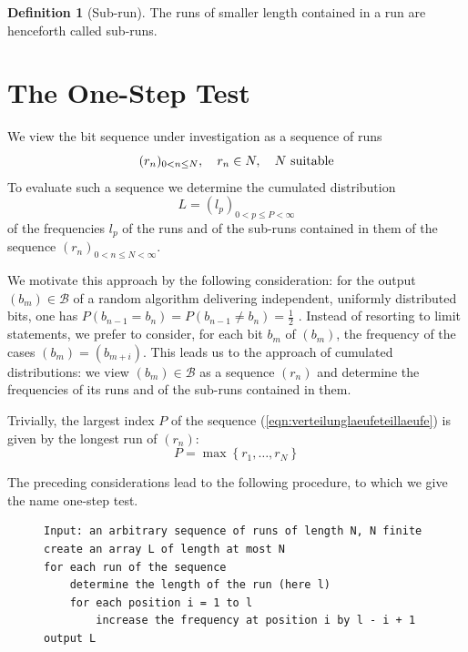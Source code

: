 \documentclass[11pt,a4paper]{scrartcl}
\theoremstyle{plain}
\theoremstyle{definition}
\newtheorem{defi}[satz]{Definition}
\theoremstyle{remark}
\begin{document}
\begin{defi}[Sub-run]\label{defi:teillauf}
The runs of smaller length contained in a run are henceforth called
sub-runs.
\end{defi}

\section{The One-Step Test}\label{sec:einschritttest}

We view the bit sequence under investigation as a sequence of runs
\begin{equation}\label{eqn:laeuflangefolge}
  (r_n)_{0<n\leq N},\quad r_n\in\mathcal \mathbb N,\quad N\text{ suitable}
\end{equation}
To evaluate such a sequence we determine the cumulated distribution
\begin{equation}\label{eqn:verteilunglaeufeteillaeufe}
  L=(l_p)_{0<p\leq P<\infty}
\end{equation}
of the frequencies $l_p$ of the runs and of the sub-runs contained in
them of the sequence $(r_n)_{0<n\leq N<\infty}$.

We motivate this approach by the following consideration: for the
output $(b_m)\in \mathcal B$ of a random algorithm delivering
independent, uniformly distributed bits, one has
$P(b_{n-1}=b_n)=P(b_{n-1}\neq b_n)=\tfrac{1}{2}$ \cite{feller1968}.
Instead of resorting to limit statements, we prefer to consider, for
each bit $b_m$ of $(b_m)$, the frequency of the cases
$(b_{m})=(b_{m+i})$. This leads us to the approach of cumulated
distributions: we view $(b_m)\in\mathcal B$ as a sequence $(r_n)$ and
determine the frequencies of its runs and of the sub-runs contained
in them.

Trivially, the largest index $P$ of the sequence
(\ref{eqn:verteilunglaeufeteillaeufe}) is given by the longest run of
$(r_n)$:
\begin{equation}\label{eqn:maximalelaengevonl}
  P=\max\left\{ r_1,\dots, r_N\right\}
\end{equation}

\noindent The preceding considerations lead to the following
procedure, to which we give the name one-step test.

\begin{figure}[htbp]
\begin{lstlisting}[caption={One-step test for sequences of runs},label={algo:einschritt-laeufe}]
Input: an arbitrary sequence of runs of length N, N finite
create an array L of length at most N
for each run of the sequence
    determine the length of the run (here l)
    for each position i = 1 to l
        increase the frequency at position i by l - i + 1
output L
\end{lstlisting}
\end{figure}
\end{document}
